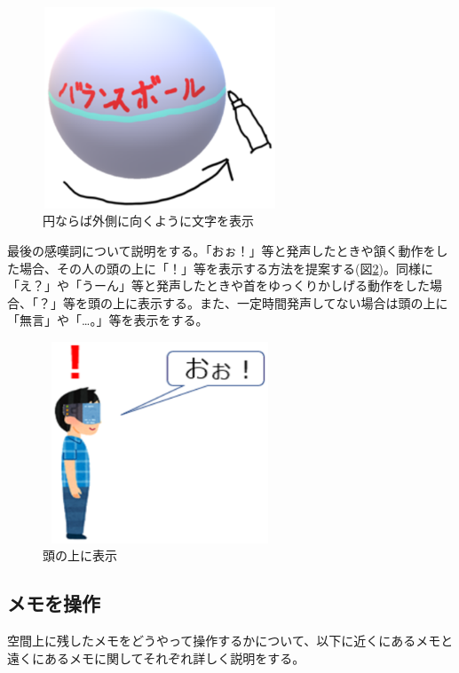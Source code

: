 \documentclass[11pt,a4j, titlepage]{jarticle} %
\begin{document}
\begin{figure}[H]
  \begin{center}
    \includegraphics[clip,height=6.0cm,width=7.0cm]{./moji_seiteki.eps}
    \caption{円ならば外側に向くように文字を表示}
    \label{fig:moji_seiteki}
  \end{center}
\end{figure}

最後の感嘆詞について説明をする。「おぉ！」等と発声したときや頷く動作をした場合、その人の頭の上に「！」等を表示する方法を提案する(図\ref{fig:kantanshi})。同様に「え？」や「うーん」等と発声したときや首をゆっくりかしげる動作をした場合、「？」等を頭の上に表示する。また、一定時間発声してない場合は頭の上に「無言」や「…。」等を表示をする。

\begin{figure}[H]
  \begin{center}
    \includegraphics[clip,height=6.0cm,width=7.0cm]{./kantanshi.eps}
    \caption{頭の上に表示}
    \label{fig:kantanshi}
  \end{center}
\end{figure}

\subsection{メモを操作}
空間上に残したメモをどうやって操作するかについて、以下に近くにあるメモと遠くにあるメモに関してそれぞれ詳しく説明をする。
\end{document}

